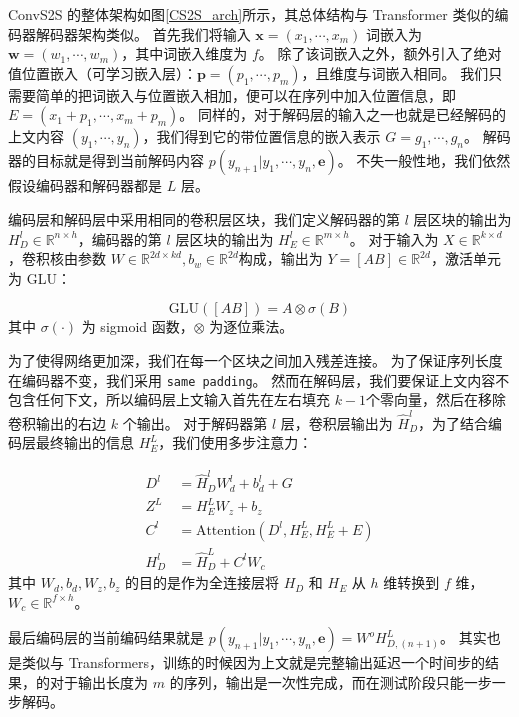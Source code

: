 ConvS2S 的整体架构如图\ref{CS2S_arch}所示，其总体结构与 Transformer 类似的编码器解码器架构类似。
首先我们将输入 $\bm{x} = (x_1, \cdots, x_m)$ 词嵌入为 $\bm{w} = (w_1, \cdots, w_m)$，其中词嵌入维度为 $f$。
除了该词嵌入之外，额外引入了绝对值位置嵌入（可学习嵌入层）：$\bm{p} = (p_1, \cdots, p_m)$，且维度与词嵌入相同。
我们只需要简单的把词嵌入与位置嵌入相加，便可以在序列中加入位置信息，即 $E = (x_1 + p_1, \cdots, x_m + p_m)$。
同样的，对于解码层的输入之一也就是已经解码的上文内容 $(y_1, \cdots, y_n)$，我们得到它的带位置信息的嵌入表示 $G = g_1, \cdots, g_n$。
解码器的目标就是得到当前解码内容 $p(y_{n+1}|y_1,\cdots,y_n, \bm{e})$。
不失一般性地，我们依然假设编码器和解码器都是 $L$ 层。

编码层和解码层中采用相同的卷积层区块，我们定义解码器的第 $l$ 层区块的输出为 $H_D^l \in \mathbb{R}^{n \times h}$，编码器的第 $l$ 层区块的输出为 $H_E^l \in \mathbb{R}^{m \times h}$。
对于输入为 $X \in \mathbb{R}^{k \times d}$，卷积核由参数 $W \in \mathbb{R}^{2d \times kd}, b_w \in \mathbb{R}^{2d}$构成，输出为 $Y = [A B] \in \mathbb{R}^{2d}$，激活单元为 GLU\cite{GLU}：

\begin{equation}
	\text{GLU}([A B]) = A \otimes \sigma(B)
\end{equation}
其中 $\sigma(\cdot)$ 为 sigmoid 函数，$\otimes$ 为逐位乘法。

为了使得网络更加深，我们在每一个区块之间加入残差连接。
为了保证序列长度在编码器不变，我们采用 \texttt{same padding}。
然而在解码层，我们要保证上文内容不包含任何下文，所以编码层上文输入首先在左右填充 $k-1$个零向量，然后在移除卷积输出的右边 $k$ 个输出。
对于解码器第 $l$ 层，卷积层输出为 $\hat{H}_D^l$，为了结合编码层最终输出的信息 $H_E^L$，我们使用多步注意力：

\begin{align}
	D^l &= \hat{H}_D^l W_d^l + b_d^l + G \\
	Z^L &= H_E^L W_z + b_z \\
	C^l &= \text{Attention}(D^l, H_E^L, H_E^L + E) \\
	H_D^l &= \hat{H}^L_D + C^l W_c
\end{align}
其中 $W_d, b_d, W_z, b_z$ 的目的是作为全连接层将 $H_D$ 和 $H_E$ 从 $h$ 维转换到 $f$ 维，$W_c \in \mathbb{R}^{f \times h}$。

最后编码层的当前编码结果就是 $p(y_{n+1}|y_1,\cdots,y_n, \bm{e}) = W^o H_{D,(n+1)}^L$。
其实也是类似与 Transformers，训练的时候因为上文就是完整输出延迟一个时间步的结果，的对于输出长度为 $m$ 的序列，输出是一次性完成，而在测试阶段只能一步一步解码。

